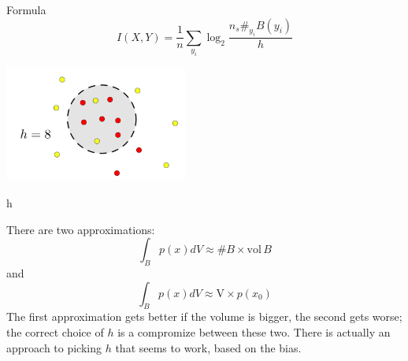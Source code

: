 \documentclass{beamer}
\begin{document}
\begin{frame}{Formula}
\color{dark}
$$I(X,Y)=\frac{1}{n}\sum_{y_i}\log_2{\frac{n_s \#_{y_i}B(y_i)}{h}}$$
\color{black}
\begin{center}
\includegraphics[width=6cm]{dots.png}
\end{center}
\end{frame}


\begin{frame}{h}

  There are two approximations:
  \color{dark}
$$\int_B p(x)dV \approx \# B\times \mbox{vol}\,B$$
\color{black}
  and
\color{dark}
  $$\int_B p(x)dV \approx \mbox{V}\times p(x_0)$$ 
\color{black}
The first approximation gets better if the volume is bigger, the
second gets worse; the correct choice of $h$ is a compromize between
these two. There is actually an approach to picking $h$ that
seems to work, based on the bias.
\end{frame}
\end{document}
